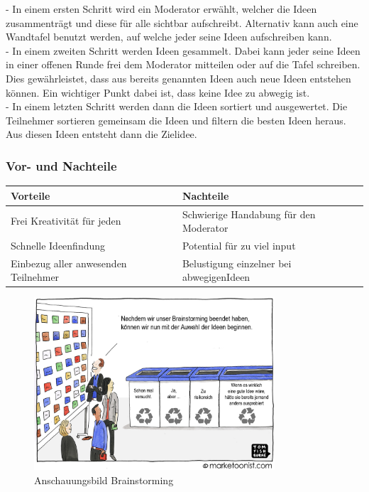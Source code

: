- In einem ersten Schritt wird ein Moderator erwählt, welcher die Ideen zusammenträgt und diese für alle sichtbar aufschreibt. Alternativ kann auch eine Wandtafel benutzt werden, auf welche jeder seine Ideen aufschreiben kann.\\
- In einem zweiten Schritt werden Ideen gesammelt. Dabei kann jeder seine Ideen in einer offenen Runde frei dem Moderator mitteilen oder auf die Tafel schreiben. Dies gewährleistet, dass aus bereits genannten Ideen auch neue Ideen entstehen können. Ein wichtiger Punkt dabei ist, dass keine Idee zu abwegig ist. \\
- In einem letzten Schritt werden dann die Ideen sortiert und ausgewertet. Die Teilnehmer sortieren gemeinsam die Ideen und filtern die besten Ideen heraus. Aus diesen Ideen entsteht dann die Zielidee. 

\subsubsection{Vor- und Nachteile}

\begin{tabular}{|l|l|}
	\hline 
	\textbf{Vorteile} & \textbf{Nachteile} \\ 
	\hline 
	Frei Kreativität für jeden & Schwierige Handabung für den Moderator  \\
	\hline 
	Schnelle Ideenfindung & Potential für zu viel input \\ 
	\hline 
	Einbezug aller anwesenden Teilnehmer & Belustigung einzelner bei \flqq abwegigen\frqq  Ideen\\
	\hline
\end{tabular} 


\begin{figure}[h!]
	\centering
	\includegraphics[width=0.8\textwidth]{graphics/Brain}
	\caption{Anschauungsbild Brainstorming}
	\label{fig:Brainstorming}
\end{figure} 




  

